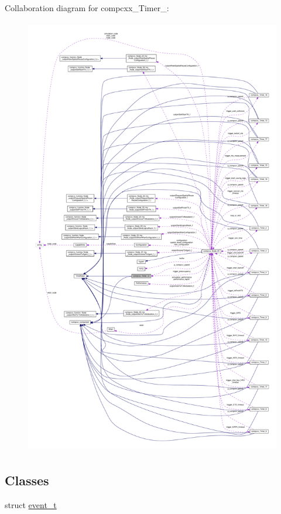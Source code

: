 Collaboration diagram for compcxx\+\_\+\+Timer\+\_\+:\nopagebreak
\begin{figure}[H]
\begin{center}
\leavevmode
\includegraphics[height=550pt]{classcompcxx__Timer__12__coll__graph}
\end{center}
\end{figure}
\subsection*{Classes}
\begin{DoxyCompactItemize}
\item 
struct \hyperlink{structcompcxx__Timer__12_1_1event__t}{event\+\_\+t}
\end{DoxyCompactItemize}
